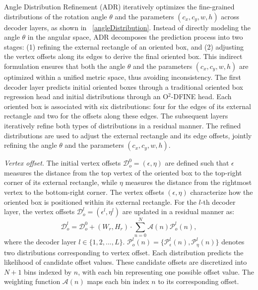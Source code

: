 \documentclass[lettersize,journal]{IEEEtran}
\begin{document}
Angle Distribution Refinement (ADR) iteratively optimizes the fine-grained distributions of the rotation angle $\theta$ and the parameters $(c_x,c_y,w,h)$ across decoder layers, as shown in \figurename~\ref{angleDistribution}. Instead of directly modeling the angle $\theta$ in the angular space, ADR decomposes the prediction process into two stages: (1) refining the external rectangle of an oriented box, and (2) adjusting the vertex offsets along its edges to derive the final oriented box. This indirect formulation ensures that both the angle $\theta$ and the parameters $(c_x, c_y, w, h)$ are optimized within a unified metric space, thus avoiding inconsistency.
The first decoder layer predicts initial oriented boxes through a traditional oriented box regression head and initial distributions through an O$^2$-DFINE head. Each oriented box is associated with six distributions: four for the edges of its external rectangle and two for the offsets along these edges. The subsequent layers iteratively refine both types of distributions in a residual manner. The refined distributions are used to adjust the external rectangle and its edge offsets, jointly refining the angle $\theta$ and the parameters $(c_x, c_y, w, h)$. 

\textit{Vertex offset.}
The initial vertex offsets $\mathcal{D}_o^0 = (\epsilon, \eta)$ are defined such that $\epsilon$ measures the distance from the top vertex of the oriented box to the top-right corner of its external rectangle, while $\eta$ measures the distance from the rightmost vertex to the bottom-right corner.
The vertex offsets $(\epsilon, \eta)$ characterize how the oriented box is positioned within its external rectangle.
For the $l$-th decoder layer, the vertex offsets $\mathcal{D}_o^l=(\epsilon^l,\eta^l)$ are updated in a residual manner as:
\begin{equation}
\mathcal{D}_o^l = \mathcal{D}_o^0 + (W_r, H_r) \cdot \sum_{n=0}^{N} \mathcal{A}(n)\mathcal{P}_o^{l}(n), 
\end{equation}
where the decoder layer $l\in\{1,2,...,L\}$. $\mathcal{P}_o^l(n)=\{\mathcal{P}_\epsilon^l(n),\mathcal{P}_\eta^l(n)\}$ denotes two distributions corresponding to vertex offset. Each distribution predicts the likelihood of candidate offset values. These candidate offsets are discretized into $N+1$ bins indexed by $n$, with each bin representing one possible offset value. The weighting function $\mathcal{A}(n)$ maps each bin index $n$ to its corresponding offset.
\end{document}

